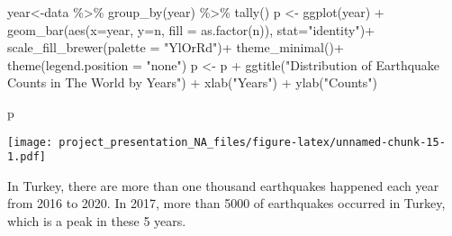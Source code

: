 \documentclass[
]{article}
\newenvironment{Shaded}{\begin{snugshade}}{\end{snugshade}}
\newcommand{\AttributeTok}[1]{\textcolor[rgb]{0.77,0.63,0.00}{#1}}
\newcommand{\FunctionTok}[1]{\textcolor[rgb]{0.00,0.00,0.00}{#1}}
\newcommand{\NormalTok}[1]{#1}
\newcommand{\OtherTok}[1]{\textcolor[rgb]{0.56,0.35,0.01}{#1}}
\newcommand{\SpecialCharTok}[1]{\textcolor[rgb]{0.00,0.00,0.00}{#1}}
\newcommand{\StringTok}[1]{\textcolor[rgb]{0.31,0.60,0.02}{#1}}
\begin{document}
\begin{Shaded}
\begin{Highlighting}[]
\NormalTok{year}\OtherTok{\textless{}{-}}\NormalTok{data }\SpecialCharTok{\%\textgreater{}\%} \FunctionTok{group\_by}\NormalTok{(year) }\SpecialCharTok{\%\textgreater{}\%} \FunctionTok{tally}\NormalTok{()}
\NormalTok{p }\OtherTok{\textless{}{-}} \FunctionTok{ggplot}\NormalTok{(year) }\SpecialCharTok{+} \FunctionTok{geom\_bar}\NormalTok{(}\FunctionTok{aes}\NormalTok{(}\AttributeTok{x=}\NormalTok{year, }\AttributeTok{y=}\NormalTok{n, }\AttributeTok{fill =} \FunctionTok{as.factor}\NormalTok{(n)), }\AttributeTok{stat=}\StringTok{"identity"}\NormalTok{)}\SpecialCharTok{+}
      \FunctionTok{scale\_fill\_brewer}\NormalTok{(}\AttributeTok{palette =} \StringTok{"YlOrRd"}\NormalTok{)}\SpecialCharTok{+}
      \FunctionTok{theme\_minimal}\NormalTok{()}\SpecialCharTok{+}
      \FunctionTok{theme}\NormalTok{(}\AttributeTok{legend.position =} \StringTok{"none"}\NormalTok{)}
\NormalTok{p }\OtherTok{\textless{}{-}}\NormalTok{ p }\SpecialCharTok{+} \FunctionTok{ggtitle}\NormalTok{(}\StringTok{"Distribution of Earthquake Counts in The World by Years"}\NormalTok{) }\SpecialCharTok{+}
      \FunctionTok{xlab}\NormalTok{(}\StringTok{"Years"}\NormalTok{) }\SpecialCharTok{+} \FunctionTok{ylab}\NormalTok{(}\StringTok{"Counts"}\NormalTok{)}

\NormalTok{p}
\end{Highlighting}
\end{Shaded}

\texttt{[image: project\_presentation\_NA\_files/figure-latex/unnamed-chunk-15-1.pdf]}

In Turkey, there are more than one thousand earthquakes happened each
year from 2016 to 2020. In 2017, more than 5000 of earthquakes occurred
in Turkey, which is a peak in these 5 years.
\end{document}
